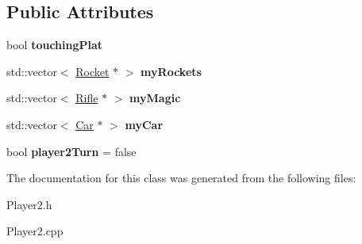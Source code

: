 \subsection*{Public Attributes}
\begin{DoxyCompactItemize}
\item 
bool {\bfseries touching\+Plat}\hypertarget{class_player2_a68b6910c22e7004465469cc39a2498f9}{}\label{class_player2_a68b6910c22e7004465469cc39a2498f9}

\item 
std\+::vector$<$ \hyperlink{class_rocket}{Rocket} $\ast$ $>$ {\bfseries my\+Rockets}\hypertarget{class_player2_afebe161127912ee284699608ec83f2da}{}\label{class_player2_afebe161127912ee284699608ec83f2da}

\item 
std\+::vector$<$ \hyperlink{class_rifle}{Rifle} $\ast$ $>$ {\bfseries my\+Magic}\hypertarget{class_player2_a90939acc95f619e835fb7ea11b55d8fb}{}\label{class_player2_a90939acc95f619e835fb7ea11b55d8fb}

\item 
std\+::vector$<$ \hyperlink{class_car}{Car} $\ast$ $>$ {\bfseries my\+Car}\hypertarget{class_player2_ab5c4465df23a95445b23ed883da3bf36}{}\label{class_player2_ab5c4465df23a95445b23ed883da3bf36}

\item 
bool {\bfseries player2\+Turn} = false\hypertarget{class_player2_ab5ab51b6b06ace7a897614166c7a802a}{}\label{class_player2_ab5ab51b6b06ace7a897614166c7a802a}

\end{DoxyCompactItemize}


The documentation for this class was generated from the following files\+:\begin{DoxyCompactItemize}
\item 
Player2.\+h\item 
Player2.\+cpp\end{DoxyCompactItemize}
